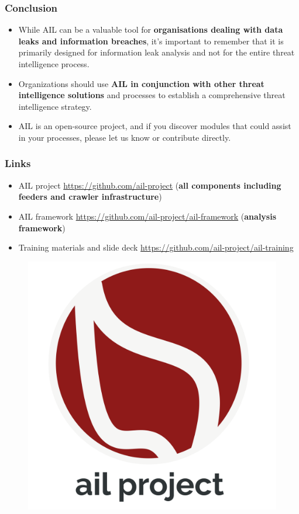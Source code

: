 \documentclass{beamer}
\begin{document}
\begin{frame}
    \frametitle{Conclusion}
\begin{itemize}
    \item While AIL can be a valuable tool for {\bf organisations dealing with data leaks and information breaches}, it's important to remember that it is primarily designed for information leak analysis and not for the entire threat intelligence process.
    \item Organizations should use \textbf{AIL in conjunction with other threat intelligence solutions} and processes to establish a comprehensive threat intelligence strategy.
    \item AIL is an open-source project, and if you discover modules that could assist in your processes, please let us know or contribute directly.
\end{itemize}
\end{frame}

\begin{frame}
\frametitle{Links}
    \begin{itemize}
        \item AIL project \url{https://github.com/ail-project} ({\bf all components including feeders and crawler infrastructure})
        \item AIL framework \url{https://github.com/ail-project/ail-framework} ({\bf analysis framework})
        \item Training materials and slide deck \url{https://github.com/ail-project/ail-training}
    \end{itemize}
    \begin{figure}
        \includegraphics[scale=0.10, angle=0]{images/ail-project.png}
    \end{figure}
\end{frame}
\end{document}
